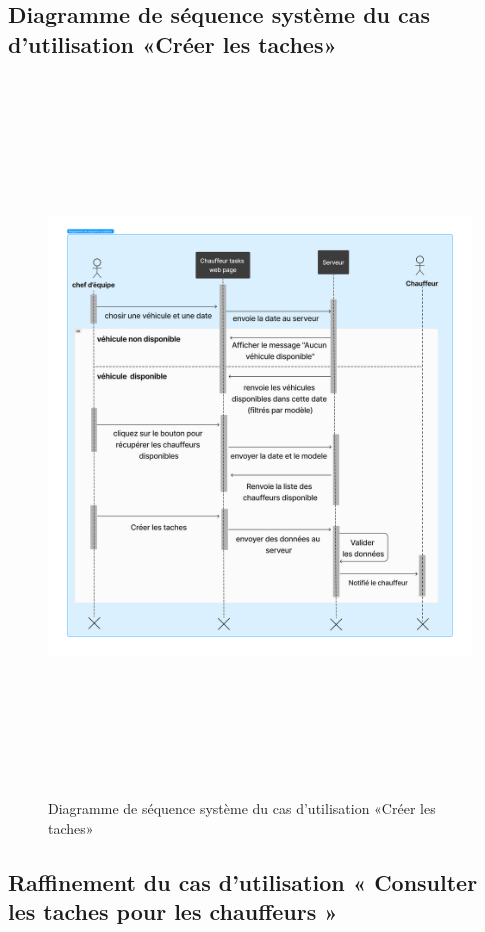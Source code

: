 \newpage
\subsection{Diagramme de séquence système du cas d’utilisation «Créer les taches»}

\begin{figure}[ht!]
  \centering
  \includegraphics[width=1\textwidth,height=19cm]{chap4.images/dss creer taches.png}
  \caption{ Diagramme de séquence système du cas d’utilisation «Créer les taches» }
\end{figure}


\newpage
\subsection{Raffinement du cas d'utilisation « Consulter les taches pour les chauffeurs »}

